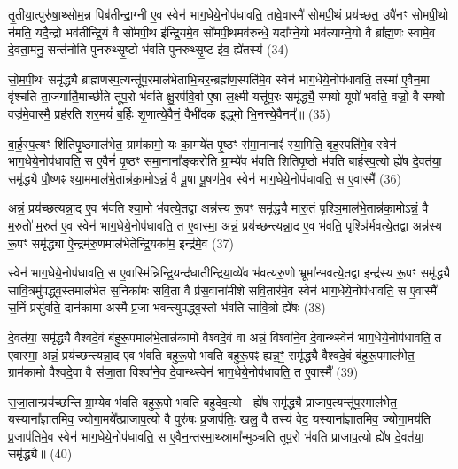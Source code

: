 तृ॒तीया॒त्पुरु॑षा॒थ्सोम॒न्न पिब॑तीन्द्रा॒ग्नी ए॒व स्वेन॑ भाग॒धेये॒नोप॑धावति॒ तावे॒वास्मै॑ सोमपी॒थं प्रय॑च्छत॒ उपै॑नꣳ सोमपी॒थो न॑मति॒ यदै॒न्द्रो भव॑तीन्द्रि॒यं वै सो॑मपी॒थ इ॑न्द्रि॒यमे॒व सो॑मपी॒थमव॑रुन्धे॒ यदा᳚ग्ने॒यो भव॑त्याग्ने॒यो वै ब्रा᳚ह्म॒णः स्वामे॒व दे॒वता॒मनु॒ सन्त॑नोति पुनरुथ्सृ॒ष्टो भ॑वति पुनरुथ्सृ॒ष्ट इ॑व॒ ह्ये॑तस्य॑ (34)

सो॒म॒पी॒थः समृ॑द्ध्यै ब्राह्मणस्प॒त्यन्तू॑प॒रमाल॑भेताभि॒चर॒न्ब्रह्म॑ण॒स्पति॑मे॒व स्वेन॑ भाग॒धेये॒नोप॑धावति॒ तस्मा॑ ए॒वैन॒मा वृ॑श्चति ता॒जगार्ति॒मार्च्छ॑ति तूप॒रो भ॑वति क्षु॒रप॑वि॒र्वा ए॒षा ल॒क्ष्मी यत्तू॑प॒रः समृ॑द्ध्यै॒ स्फ्यो यूपो॑ भवति॒ वज्रो॒ वै स्फ्यो वज्र॑मे॒वास्मै॒ प्रह॑रति शर॒मयं॑ ब॒र्\mbox{}हिः शृ॒णात्ये॒वैनं॒ वैभी॑दक इ॒द्ध्मो भि॒नत्त्ये॒वैनम्᳚॥ (35)

{}

बा॒र्\mbox{}ह॒स्प॒त्यꣳ शि॑तिपृ॒ष्ठमाल॑भेत॒ ग्राम॑कामो॒ यः का॒मये॑त पृ॒ष्ठꣳ स॑मा॒नानाꣴ॑ स्या॒मिति॒ बृह॒स्पति॑मे॒व स्वेन॑ भाग॒धेये॒नोप॑धावति॒ स ए॒वैनं॑ पृ॒ष्ठꣳ स॑मा॒नाना᳚ङ्करोति ग्रा॒म्ये॑व भ॑वति शितिपृ॒ष्ठो भ॑वति बार्\mbox{}हस्प॒त्यो ह्ये॑ष दे॒वत॑या॒ समृ॑द्ध्यै पौ॒ष्णꣴ श्या॒ममाल॑भे॒तान्न॑का॒मो\-ऽन्नं॒ वै पू॒षा पू॒षण॑मे॒व स्वेन॑ भाग॒धेये॒नोप॑धावति॒ स ए॒वास्मै᳚ (36)

अन्नं॒ प्रय॑च्छत्यन्ना॒द ए॒व भ॑वति श्या॒मो भ॑वत्ये॒तद्वा अन्न॑स्य रू॒पꣳ समृ॑द्ध्यै मारु॒तं पृश्ञि॒माल॑भे॒तान्न॑का॒मो\-ऽन्नं॒ वै म॒रुतो॑ म॒रुत॑ ए॒व स्वेन॑ भाग॒धेये॒नोप॑धावति॒ त ए॒वास्मा॒ अन्नं॒ प्रय॑च्छन्त्यन्ना॒द ए॒व भ॑वति॒ पृश्ञि॑र्भवत्ये॒तद्वा अन्न॑स्य रू॒पꣳ समृ॑द्ध्या ऐ॒न्द्रम॑रु॒णमाल॑भेतेन्द्रि॒यका॑म॒ इन्द्र॑मे॒व (37)

स्वेन॑ भाग॒धेये॒नोप॑धावति॒ स ए॒वास्मि॑न्निन्द्रि॒यन्द॑धातीन्द्रिया॒व्ये॑व भ॑वत्यरु॒णो भ्रूमा᳚न्भवत्ये॒तद्वा इन्द्र॑स्य रू॒पꣳ समृ॑द्ध्यै सावि॒त्रमु॑पद्ध्व॒स्तमाल॑भेत स॒निका॑मः सवि॒ता वै प्र॑स॒वाना॑मीशे सवि॒तार॑मे॒व स्वेन॑ भाग॒धेये॒नोप॑धावति॒ स ए॒वास्मै॑ स॒निं प्रसु॑वति॒ दान॑कामा अस्मै प्र॒जा भ॑वन्त्युपद्ध्व॒स्तो भ॑वति सावि॒त्रो ह्ये॑षः (38)

दे॒वत॑या॒ समृ॑द्ध्यै वैश्वदे॒वं ब॑हुरू॒पमाल॑भे॒तान्न॑कामो वैश्वदे॒वं वा अन्नं॒ विश्वा॑ने॒व दे॒वान्थ्स्वेन॑ भाग॒धेये॒नोप॑धावति॒ त ए॒वास्मा॒ अन्नं॒ प्रय॑च्छन्त्यन्ना॒द ए॒व भ॑वति बहुरू॒पो भ॑वति बहुरू॒पꣴ ह्यन्न॒ꣳ॒ समृ॑द्ध्यै वैश्वदे॒वं ब॑हुरू॒पमाल॑भेत॒ ग्राम॑कामो वैश्वदे॒वा वै स॑जा॒ता विश्वा॑ने॒व दे॒वान्थ्स्वेन॑ भाग॒धेये॒नोप॑धावति॒ त ए॒वास्मै᳚ (39)

स॒जा॒तान्प्रय॑च्छन्ति ग्रा॒म्ये॑व भ॑वति बहुरू॒पो भ॑वति बहुदेव॒त्यो  ह्ये॑ष समृ॑द्ध्यै प्राजाप॒त्यन्तू॑प॒रमाल॑भेत॒ यस्याना᳚ज्ञातमिव॒ ज्योगा॒मये᳚त्प्राजाप॒त्यो वै पुरु॑षः प्र॒जाप॑तिः॒ खलु॒ वै तस्य॑ वेद॒ यस्याना᳚ज्ञातमिव॒ ज्योगा॒मय॑ति प्र॒जाप॑तिमे॒व स्वेन॑ भाग॒धेये॒नोप॑धावति॒ स ए॒वैन॒न्तस्मा॒थ्स्रामा᳚न्मुञ्चति तूप॒रो भ॑वति प्राजाप॒त्यो ह्ये॑ष दे॒वत॑या॒ समृ॑द्ध्यै॥ (40)

